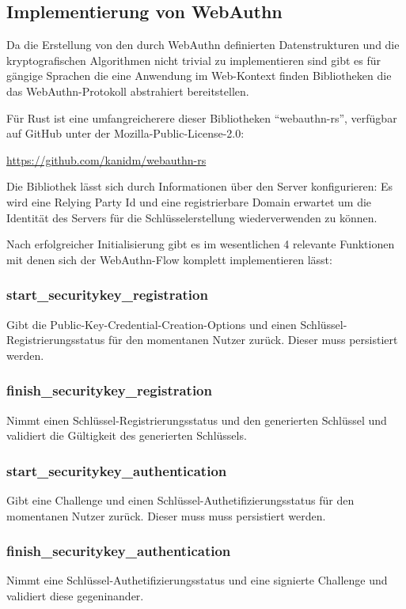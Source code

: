 \documentclass[journal]{IEEEtran}
\begin{document}
\subsection{Implementierung von WebAuthn}

Da die Erstellung von den durch WebAuthn definierten Datenstrukturen und die
kryptografischen Algorithmen nicht trivial zu implementieren sind gibt es für
gängige Sprachen die eine Anwendung im Web-Kontext finden Bibliotheken die das
WebAuthn-Protokoll abstrahiert bereitstellen.

Für Rust ist eine umfangreicherere dieser Bibliotheken ``webauthn-rs'',
verfügbar auf GitHub unter der Mozilla-Public-License-2.0:

\url{https://github.com/kanidm/webauthn-rs}

Die Bibliothek lässt sich durch Informationen über den Server konfigurieren:
Es wird eine Relying Party Id und eine registrierbare Domain erwartet um die
Identität des Servers für die Schlüsselerstellung wiederverwenden zu können.

Nach erfolgreicher Initialisierung gibt es im wesentlichen 4 relevante
Funktionen mit denen sich der WebAuthn-Flow komplett implementieren lässt:

\subsubsection{start\_securitykey\_registration}
Gibt die Public-Key-Credential-Creation-Options und einen
Schlüssel-Registrierungsstatus für den momentanen Nutzer zurück. Dieser muss
persistiert werden.

\subsubsection{finish\_securitykey\_registration}
Nimmt einen Schlüssel-Registrierungsstatus und den generierten Schlüssel und
validiert die Gültigkeit des generierten Schlüssels.

\subsubsection{start\_securitykey\_authentication}
Gibt eine Challenge und einen Schlüssel-Authetifizierungsstatus für den
momentanen Nutzer zurück. Dieser muss muss persistiert werden.

\subsubsection{finish\_securitykey\_authentication}
Nimmt eine Schlüssel-Authetifizierungsstatus und eine signierte Challenge und
validiert diese gegeninander.
\end{document}
